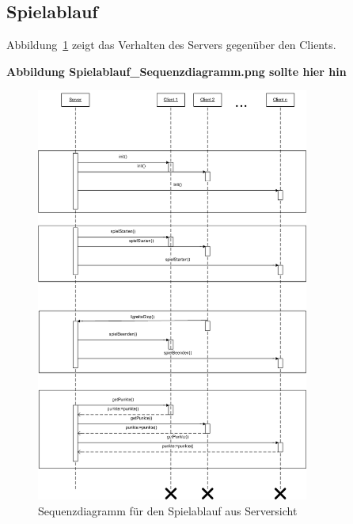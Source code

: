 \newpage

\subsection{Spielablauf}

Abbildung~\ref{SequenzdiagramServer} zeigt das Verhalten des Servers gegenüber den Clients.

\color{red}
\textbf{Abbildung Spielablauf\_Sequenzdiagramm.png sollte hier hin}
\color{black}

 \begin{figure}[hbt]
  \centering
  \includegraphics[width=0.80\textwidth,angle=0]{graphics/Spielablauf_Sequenzdiagramm.png}
  \caption{Sequenzdiagramm für den Spielablauf aus Serversicht \hfill{} }
  \label{SequenzdiagramServer}
 \end{figure}

